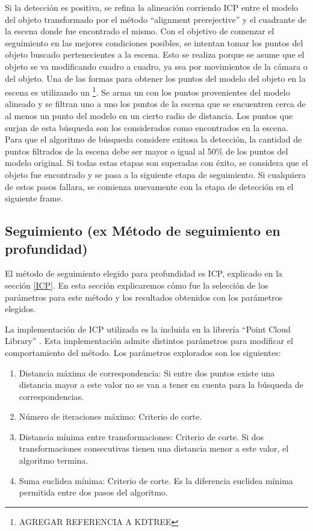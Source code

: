 Si la detección es positiva, se refina la alineación corriendo ICP entre el modelo del objeto transformado por el método ``alignment prerejective'' y el cuadrante de la escena donde fue encontrado el mismo. Con el objetivo de comenzar el seguimiento en las mejores condiciones posibles, se intentan tomar los puntos del objeto buscado pertenecientes a la escena. Esto se realiza porque se asume que el objeto se va modificando cuadro a cuadro, ya sea por movimientos de la cámara o del objeto. Una de las formas para obtener los puntos del modelo del objeto en la escena es utilizando un \kdt\footnote{AGREGAR REFERENCIA A KDTREE}.  Se arma un \kdt con los puntos provenientes del modelo alineado y se filtran uno a uno los puntos de la escena que se encuentren cerca de al menos un punto del modelo en un cierto radio de distancia.  Los puntos que surjan de esta búsqueda son los considerados como encontrados en la escena. Para que el algoritmo de búsqueda considere exitosa la detección, la cantidad de puntos filtrados de la escena debe ser mayor o igual al 50\% de los puntos del modelo original. Si todas estas etapas son superadas con éxito, se considera que el objeto fue encontrado y se pasa a la siguiente etapa de seguimiento. Si cualquiera de estos pasos fallara, se comienza nuevamente con la etapa de detección en el siguiente frame.


\subsection{Seguimiento (ex Método de seguimiento en profundidad)}
El método de seguimiento elegido para profundidad es ICP, explicado en la sección \ref{ICP}. En esta sección explicaremos cómo fue la selección de los parámetros para este método y los resultados obtenidos con los parámetros elegidos.

La implementación de ICP utilizada es la incluida en la librería ``Point Cloud Library'' \cite{Rusu_ICRA2011_PCL}. Esta implementación admite distintos parámetros para modificar el comportamiento del método. Los parámetros explorados son los siguientes:

\begin{enumerate}
	\item Distancia máxima de correspondencia: Si entre dos puntos existe una distancia mayor a este valor no se van a tener en cuenta para la búsqueda de correspondencias.
	\item Número de iteraciones máximo: Criterio de corte.
	\item Distancia mínima entre transformaciones: Criterio de corte. Si dos transformaciones consecutivas tienen una distancia menor a este valor, el algoritmo termina.
	\item Suma euclidea mínima: Criterio de corte. Es la diferencia euclidea mínima permitida entre dos pasos del algoritmo.
\end{enumerate}

